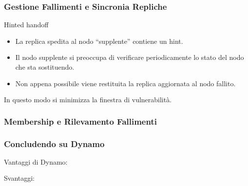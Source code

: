 \begin{frame}
  \frametitle{Gestione Fallimenti e Sincronia Repliche}
  \begin{block}{Hinted handoff}
  \begin{itemize}
  \item La replica spedita al nodo ``supplente'' contiene un \alert{hint}.
  \item Il nodo supplente si preoccupa di verificare periodicamente lo stato del nodo che sta sostituendo.
  \item Non appena possibile viene restituita la replica aggiornata al nodo fallito.
  \end{itemize}
  In questo modo si minimizza la finestra di vulnerabilità.
  \end{block}
\end{frame}


\begin{frame}
  \frametitle{Membership e Rilevamento Fallimenti}
\end{frame}

\begin{frame}
  \frametitle{Concludendo su Dynamo}
  \begin{block}{Vantaggi di Dynamo:}
  \end{block}
  \begin{block}{Svantaggi:}
  \end{block}
\end{frame}

